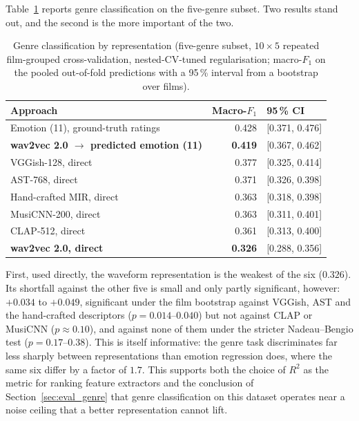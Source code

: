 Table~\ref{tab:waveform_stage2} reports genre classification on the five-genre subset. Two
results stand out, and the second is the more important of the two.

\begin{table}[t]
  \centering
  \caption{Genre classification by representation (five-genre subset, $10\times5$
    repeated film-grouped cross-validation, nested-CV-tuned regularisation; macro-$F_1$ on
    the pooled out-of-fold predictions with a 95\,\% interval from a bootstrap over films).}
  \label{tab:waveform_stage2}
  \begin{tabular}{lrl}
    \hline
    Approach & Macro-$F_1$ & 95\,\% CI \\
    \hline
    Emotion (11), ground-truth ratings                       & 0.428 & [0.371, 0.476] \\
    \textbf{wav2vec 2.0 $\rightarrow$ predicted emotion (11)} & \textbf{0.419} & [0.367, 0.462] \\
    VGGish-128, direct                                        & 0.377 & [0.325, 0.414] \\
    AST-768, direct                                           & 0.371 & [0.326, 0.398] \\
    Hand-crafted MIR, direct                                  & 0.363 & [0.318, 0.398] \\
    MusiCNN-200, direct                                       & 0.363 & [0.311, 0.401] \\
    CLAP-512, direct                                          & 0.361 & [0.313, 0.400] \\
    \textbf{wav2vec 2.0, direct}                              & \textbf{0.326} & [0.288, 0.356] \\
    \hline
  \end{tabular}
\end{table}

First, used directly, the waveform representation is the weakest of the six
($0.326$). Its shortfall against the other five is small and only partly significant,
however: $+0.034$ to $+0.049$, significant under the film bootstrap against VGGish, AST
and the hand-crafted descriptors ($p = 0.014$--$0.040$) but not against CLAP or MusiCNN
($p \approx 0.10$), and against none of them under the stricter Nadeau--Bengio test
($p = 0.17$--$0.38$). This is itself informative: the genre task discriminates far less
sharply between representations than emotion regression does, where the same six differ
by a factor of $1.7$. This supports
both the choice of $R^2$ as the metric for ranking feature extractors and the conclusion
of Section~\ref{sec:eval_genre} that genre classification on this dataset operates near
a noise ceiling that a better representation cannot lift.

